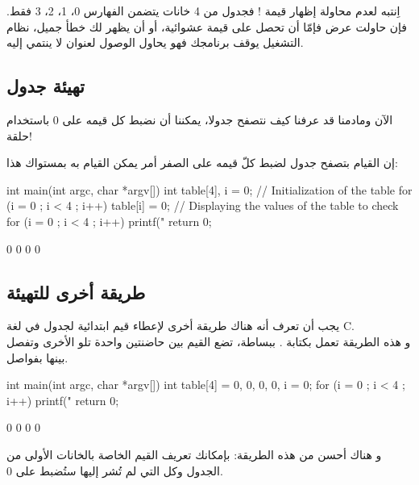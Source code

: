 \begin{critical}
  اِنتبه لعدم محاولة إظهار قيمة
!
فجدول من 4 خانات يتضمن الفهارس 0، 1، 2، 3 فقط. فإن حاولت عرض
فإمّا أن تحصل على قيمة عشوائية، أو أن يظهر لك خطأ جميل، نظام التشغيل يوقف برنامجك فهو يحاول الوصول لعنوان لا ينتمي إليه.
\end{critical}

\subsection{تهيئة جدول}

الآن ومادمنا قد عرفنا كيف نتصفح جدولا، يمكننا أن نضبط كل قيمه على 0 باستخدام حلقة!

إن القيام بتصفح جدول لضبط كلّ قيمه على الصفر أمر يمكن القيام به بمستواك هذا:

\begin{Csource}
int main(int argc, char *argv[])
{
	int table[4], i = 0;
	// Initialization of the table
	for (i = 0 ; i < 4 ; i++)
	{
    		table[i] = 0;
	}
	// Displaying the values of the table to check
	for (i = 0 ; i < 4 ; i++)
	{
    		printf("%
	}
	return 0;
}
\end{Csource}

\begin{Console}
0
0
0
0
\end{Console}

\subsection{طريقة أخرى للتهيئة}

يجب أن تعرف أنه هناك طريقة أخرى لإعطاء قيم ابتدائية لجدول في لغة \textenglish{C}.\\
و هذه الطريقة تعمل بكتابة
.
ببساطة، تضع القيم بين حاضنتين واحدة تلو الأخرى وتفصل بينها بفواصل.

\begin{Csource}
int main(int argc, char *argv[])
{
	int table[4] = {0, 0, 0, 0}, i = 0;
	for (i = 0 ; i < 4 ; i++)
	{
    	printf("%
	}
	return 0;
}
\end{Csource}

\begin{Console}
0
0
0
0
\end{Console}

و هناك أحسن من هذه الطريقة: بإمكانك تعريف القيم الخاصة بالخانات الأولى من الجدول وكل التي لم تُشر إليها ستُضبط على 0.

